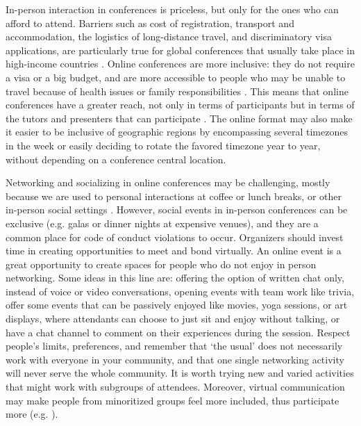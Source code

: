\documentclass[10pt,letterpaper]{article}
\begin{document}
In-person interaction in conferences is priceless, but only for the ones who can afford to attend. 
Barriers such as cost of registration, transport and accommodation, the logistics of long-distance travel, and discriminatory visa applications, are particularly true for global conferences that usually take place in high-income countries \cite{arendDisparityConferenceRegistration2019,gewinWhatScientistsShould2019}. 
Online conferences are more inclusive: they do not require a visa or a big budget, and are more accessible to people who may be unable to travel because of health issues or family responsibilities \cite{salibaGettingGripsOnline2020}.
This means that online conferences have a greater reach, not only in terms of participants but in terms of the tutors and presenters that can participate \cite{atkinsonJournalMedicine20202021, roosOnlineConferencesNew2020}.
The online format may also make it easier to be inclusive of geographic regions by encompassing several timezones in the week or easily deciding to rotate the favored timezone year to year, without depending on a conference central location. 

Networking and socializing in online conferences may be challenging, mostly because we are used to personal interactions at coffee or lunch breaks, or other in-person social settings \cite{salibaGettingGripsOnline2020}. 
However, social events in in-person conferences can be exclusive (e.g. galas or dinner nights at expensive venues), and they are a common place for code of conduct violations to occur. %
Organizers should invest time in creating opportunities to meet and bond virtually. 
An online event is a great opportunity to create spaces for people who do not enjoy in person networking. 
Some ideas in this line are: offering the option of written chat only, instead of voice or video conversations, opening events with team work like trivia, offer some events that can be passively enjoyed like movies, yoga sessions, or art displays, where attendants can choose to just sit and enjoy without talking, or have a chat channel to comment on their experiences during the session. Respect people's limits, preferences, and remember that `the usual' does not necessarily work with everyone in your community, and that one single networking activity will never serve the whole community. It is worth trying new and varied activities that might work with subgroups of attendees.
Moreover, virtual communication may make people from minoritized groups feel more included, thus participate more (e.g. \cite{trianaDoesOrderFacetoFace2012}).
\end{document}
